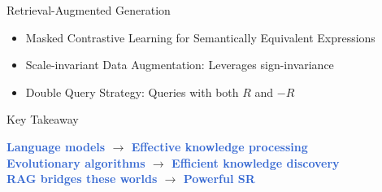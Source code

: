 \documentclass[final]{beamer}
\newcommand{\hlgreen}[1]{\textcolor{highlight}{#1}}
\newlength{\sepwid}
\newlength{\onecolwid}
\begin{document}
\begin{frame}[t]
\begin{columns}[t]
\begin{column}{\onecolwid}
\begin{block}{Retrieval-Augmented Generation}
                    \begin{itemize}
                        \item Masked Contrastive Learning for Semantically Equivalent Expressions
                        \item Scale-invariant Data Augmentation: Leverages sign-invariance
                        \item Double Query Strategy: Queries with both $R$ and $-R$
                    \end{itemize}
                \end{block}
                \vspace{-0.3cm}
                \begin{alertblock}{Key Takeaway}
                    \begin{center}
                        \textbf{\hlgreen{Language models} $\rightarrow$ \hlgreen{Effective knowledge processing}}\\
                        \textbf{\hlgreen{Evolutionary algorithms} $\rightarrow$ \hlgreen{Efficient knowledge discovery}}\\
                        \textbf{\hlgreen{RAG bridges these worlds} $\rightarrow$ \hlgreen{Powerful SR}}
                    \end{center}
                \end{alertblock}
            \end{column} %

            \begin{column}{\sepwid}\end{column} %

            \begin{column}{\onecolwid} %




\end{column}
\end{columns}
\end{frame}
\end{document}
